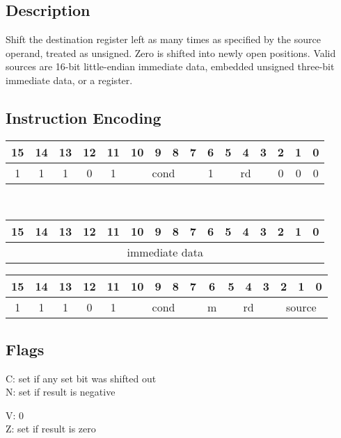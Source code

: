 \documentclass[11pt]{book}
\newcommand*{\encoding}[1]{\noindent
\begin{tabular}{|c|c|c|c|c|c|c|c|c|c|c|c|c|c|c|c|}
\multicolumn{1}{c}{15}&
\multicolumn{1}{c}{14}&
\multicolumn{1}{c}{13}&
\multicolumn{1}{c}{12}&
\multicolumn{1}{c}{11}&
\multicolumn{1}{c}{10}&
\multicolumn{1}{c}{9}&
\multicolumn{1}{c}{8}&
\multicolumn{1}{c}{7}&
\multicolumn{1}{c}{6}&
\multicolumn{1}{c}{5}&
\multicolumn{1}{c}{4}&
\multicolumn{1}{c}{3}&
\multicolumn{1}{c}{2}&
\multicolumn{1}{c}{1}&
\multicolumn{1}{c}{0}\\\hline
#1\\\hline
\end{tabular}}
\begin{document}
\subsection*{Description}
Shift the destination register left as many times
as specified by the source operand, treated as unsigned.
Zero is shifted into newly open positions.
Valid sources are 16-bit little-endian immediate data,
embedded unsigned three-bit immediate data,
or a register.

\subsection*{Instruction Encoding}
\encoding{1&1&1&0&1%
&\multicolumn{4}{|c|}{cond}%
&1&\multicolumn{3}{|c|}{rd}&0&0&0}\\\null\qquad
\encoding{\multicolumn{16}{|c|}{immediate data}}

\vspace{2\baselineskip}
\encoding{1&1&1&0&1%
&\multicolumn{4}{|c|}{cond}%
&m&\multicolumn{3}{|c|}{rd}&\multicolumn{3}{|c|}{source}}

\subsection*{Flags}
\begin{multicols}{2}\noindent
  C: set if any set bit was shifted out\\
  N: set if result is negative

  \columnbreak\noindent
  V: 0\\
  Z: set if result is zero
\end{multicols}
\end{document}
